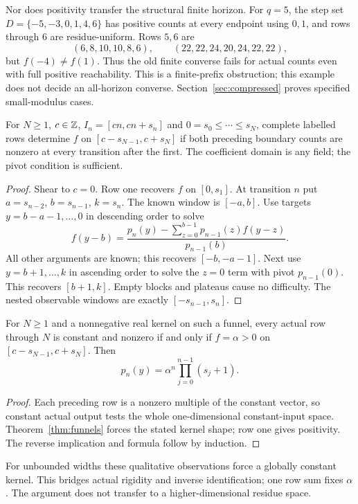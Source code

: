 Nor does positivity transfer the structural finite horizon. For $q=5$, the step set $D=\{-5,-3,0,1,4,6\}$ has positive counts at every endpoint using $0,1$, and rows through $6$ are residue-uniform. Rows $5,6$ are
\[
(6,8,10,10,8,6),\qquad(22,22,24,20,24,22,22),
\]
but $f(-4)\ne f(1)$. Thus the old finite converse fails for actual counts even with full positive reachability. This is a finite-prefix obstruction; this example does not decide an all-horizon converse. Section~\ref{sec:compressed} proves specified small-modulus cases.

\begin{theorem}\label{thm:funnelinverse}
For $N\ge1$, $c\in\mathbb Z$, $I_n=[cn,cn+s_n]$ and $0=s_0\le\cdots\le s_N$, complete labelled rows determine $f$ on $[c-s_{N-1},c+s_N]$ if both preceding boundary counts are nonzero at every transition after the first. The coefficient domain is any field; the pivot condition is sufficient.
\end{theorem}
\begin{proof}
Shear to $c=0$. Row one recovers $f$ on $[0,s_1]$. At transition $n$ put $a=s_{n-2}$, $b=s_{n-1}$, $k=s_n$. The known window is $[-a,b]$. Use targets $y=b-a-1,\ldots,0$ in descending order to solve
\[
f(y-b)=\frac{p_n(y)-\sum_{z=0}^{b-1}p_{n-1}(z)f(y-z)}{p_{n-1}(b)}.
\]
All other arguments are known; this recovers $[-b,-a-1]$. Next use $y=b+1,\ldots,k$ in ascending order to solve the $z=0$ term with pivot $p_{n-1}(0)$. This recovers $[b+1,k]$. Empty blocks and plateaus cause no difficulty. The nested observable windows are exactly $[-s_{n-1},s_n]$.
\end{proof}

\begin{proposition}\label{prop:scalarinverse}
For $N\ge1$ and a nonnegative real kernel on such a funnel, every actual row through $N$ is constant and nonzero if and only if $f=\alpha>0$ on $[c-s_{N-1},c+s_N]$. Then
\[
p_n(y)=\alpha^n\prod_{j=0}^{n-1}(s_j+1).
\]
\end{proposition}
\begin{proof}
Each preceding row is a nonzero multiple of the constant vector, so constant actual output tests the whole one-dimensional constant-input space. Theorem~\ref{thm:funnels} forces the stated kernel shape; row one gives positivity. The reverse implication and formula follow by induction.
\end{proof}
For unbounded widths these qualitative observations force a globally constant kernel. This bridges actual rigidity and inverse identification; one row sum fixes $\alpha$. The argument does not transfer to a higher-dimensional residue space.

